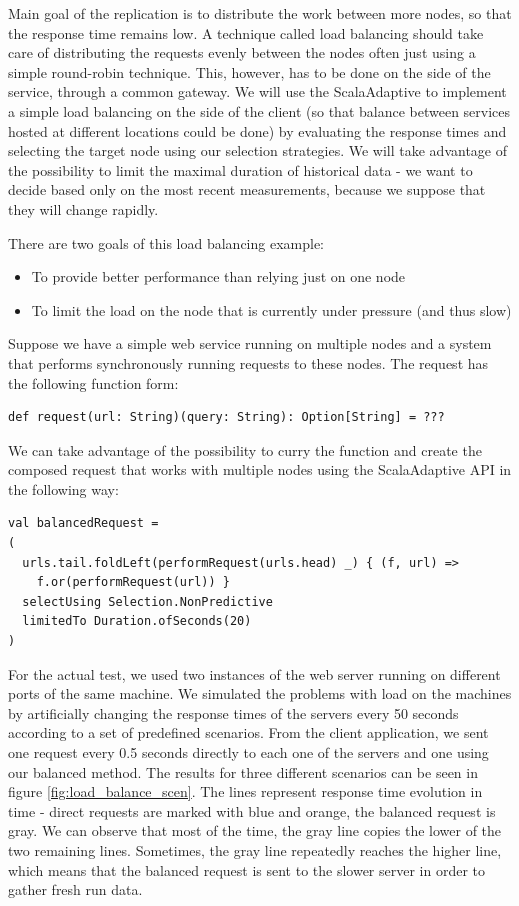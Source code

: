 Main goal of the replication is to distribute the work between more nodes, so that the response time remains low. A technique called load balancing should take care of distributing the requests evenly between the nodes often just using a simple round-robin technique. This, however, has to be done on the side of the service, through a common gateway. We will use the ScalaAdaptive to implement a simple load balancing on the side of the client (so that balance between services hosted at different locations could be done) by evaluating the response times and selecting the target node using our selection strategies. We will take advantage of the possibility to limit the maximal duration of historical data - we want to decide based only on the most recent measurements, because we suppose that they will change rapidly.

There are two goals of this load balancing example:

\begin{itemize}
	\item To provide better performance than relying just on one node
	\item To limit the load on the node that is currently under pressure (and thus slow)
\end{itemize}

Suppose we have a simple web service running on multiple nodes and a system that performs synchronously running requests to these nodes. The request has the following function form:

\lstset{style=Scala}
\begin{lstlisting}
def request(url: String)(query: String): Option[String] = ???
\end{lstlisting}

We can take advantage of the possibility to curry the function and create the composed request that works with multiple nodes using the ScalaAdaptive API in the following way:

\lstset{style=Scala}
\begin{lstlisting}
val balancedRequest =
(
  urls.tail.foldLeft(performRequest(urls.head) _) { (f, url) =>
    f.or(performRequest(url)) } 
  selectUsing Selection.NonPredictive 
  limitedTo Duration.ofSeconds(20)
)
\end{lstlisting}

For the actual test, we used two instances of the web server running on different ports of the same machine. We simulated the problems with load on the machines by artificially changing the response times of the servers every 50 seconds according to a set of predefined scenarios. From the client application, we sent one request every 0.5 seconds directly to each one of the servers and one using our balanced method. The results for three different scenarios can be seen in figure \ref{fig:load_balance_scen}. The lines represent response time evolution in time - direct requests are marked with blue and orange, the balanced request is gray. We can observe that most of the time, the gray line copies the lower of the two remaining lines. Sometimes, the gray line repeatedly reaches the higher line, which means that the balanced request is sent to the slower server in order to gather fresh run data.

